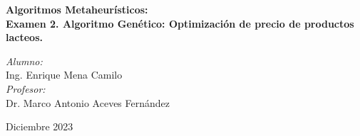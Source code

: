 
\begin{titlepage}

\vspace*{10cm}
{\huge \bfseries \textcolor{RojoUAQ}{Algoritmos Metaheurísticos: \\ Examen 2. Algoritmo Genético: Optimización de precio de productos lacteos.}}

\vspace*{1cm}

\begin{center}
	\noindent
	\begin{minipage}{0.4\textwidth}
	\begin{flushleft} \large
	\end{flushleft}
	\end{minipage}	
	\begin{minipage}{0.5\textwidth}
	\begin{flushright} \large
	\emph{Alumno:} \\
	Ing. Enrique Mena Camilo \\[1.5cm]
	\emph{Profesor:} \\
	Dr. Marco Antonio Aceves Fernández
	\end{flushright}
	\end{minipage}
	\vfill
	{\large Diciembre 2023}
\end{center}
\end{titlepage}
